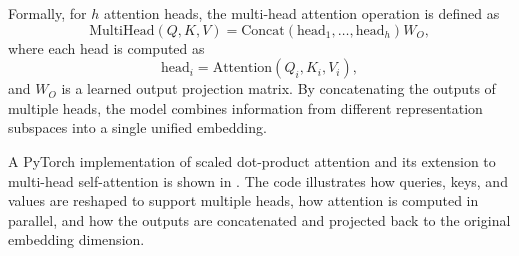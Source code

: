 Formally, for $h$ attention heads, the multi-head attention
operation is defined as
\begin{equation}
\text{MultiHead}(Q, K, V) =
\text{Concat}(\text{head}_1, \dots, \text{head}_h)W_O,
\end{equation}
where each head is computed as
\begin{equation}
\text{head}_i = \text{Attention}(Q_i, K_i, V_i),
\end{equation}
and $W_O$ is a learned output projection matrix.
By concatenating the outputs of multiple heads, the model
combines information from different representation
subspaces into a single unified embedding.

A PyTorch implementation of scaled dot-product attention
and its extension to multi-head self-attention is shown in
.
The code illustrates how queries, keys, and values are
reshaped to support multiple heads, how attention is
computed in parallel, and how the outputs are concatenated
and projected back to the original embedding dimension.

